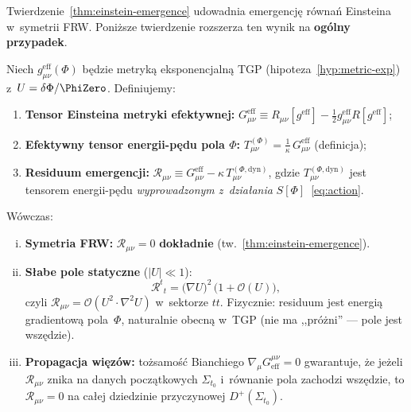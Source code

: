 Twierdzenie~\ref{thm:einstein-emergence} udowadnia emergencj\k{e}
r\'owna\'n Einsteina w~symetrii FRW. Poni\.zsze twierdzenie
rozszerza ten wynik na \textbf{og\'olny przypadek}.

\begin{theorem}\label{thm:general-emergence}
Niech $g_{\mu\nu}^{\mathrm{eff}}(\Phi)$ b\k{e}dzie metryk\k{a}
eksponencjaln\k{a} TGP (hipoteza~\ref{hyp:metric-exp}) z~$U = \delta\Phi/\PhiZero$.
Definiujemy:
\begin{enumerate}[nosep]
  \item \textbf{Tensor Einsteina metryki efektywnej:}
    $G_{\mu\nu}^{\mathrm{eff}}
    \equiv R_{\mu\nu}[g^{\mathrm{eff}}] - \frac{1}{2}g_{\mu\nu}^{\mathrm{eff}}
    R[g^{\mathrm{eff}}]$;
  \item \textbf{Efektywny tensor energii-p\k{e}du pola $\Phi$:}
    $T_{\mu\nu}^{(\Phi)} = \frac{1}{\kappa}\,G_{\mu\nu}^{\mathrm{eff}}$
    (definicja);
  \item \textbf{Residuum emergencji:}
    $\mathcal{R}_{\mu\nu}
    \equiv G_{\mu\nu}^{\mathrm{eff}} - \kappa\,T_{\mu\nu}^{(\Phi,\mathrm{dyn})}$,
    gdzie $T_{\mu\nu}^{(\Phi,\mathrm{dyn})}$ jest tensorem energii-p\k{e}du
    \emph{wyprowadzonym z~dzia\l{}ania} $S[\Phi]$~\eqref{eq:action}.
\end{enumerate}

W\'owczas:
\begin{enumerate}[(i)]
  \item \textbf{Symetria FRW:}
    $\mathcal{R}_{\mu\nu} = 0$ \textbf{dok\l{}adnie}
    (tw.~\ref{thm:einstein-emergence}).

  \item \textbf{S\l{}abe pole statyczne} ($|U| \ll 1$):
    \begin{equation}\label{eq:residuum-static}
      \mathcal{R}^t{}_t = \bigl(\nabla U\bigr)^2\,\bigl(1 + \mathcal{O}(U)\bigr),
    \end{equation}
    czyli $\mathcal{R}_{\mu\nu} = \mathcal{O}(U^2 \cdot \nabla^2 U)$
    w~sektorze $tt$. Fizycznie: residuum jest energi\k{a}
    gradientow\k{a} pola~$\Phi$, naturalnie obecn\k{a} w~TGP
    (nie ma ,,pr\'o\.zni'' --- pole jest wsz\k{e}dzie).

  \item \textbf{Propagacja wi\k{e}z\'ow:}
    to\.zsamo\'s\'c Bianchiego $\nabla_\mu G^{\mu\nu}_{\mathrm{eff}} = 0$
    gwarantuje, \.ze je\.zeli $\mathcal{R}_{\mu\nu}$ znika na
    danych pocz\k{a}tkowych $\Sigma_{t_0}$ i~r\'ownanie pola
    zachodzi wsz\k{e}dzie, to $\mathcal{R}_{\mu\nu} = 0$
    na ca\l{}ej dziedzinie przyczynowej $D^+(\Sigma_{t_0})$.


\end{enumerate}
\end{theorem}
